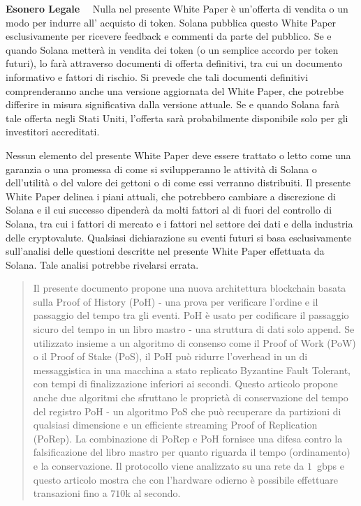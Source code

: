 \documentclass[12pt]{article}
\begin{document}
\maketitle

\textbf{\footnotesize Esonero Legale}\scriptsize
~~Nulla nel presente White Paper è un'offerta di vendita o un modo per indurre all' acquisto di token. Solana pubblica questo White Paper esclusivamente per ricevere feedback e commenti da parte del pubblico. Se e quando Solana metterà in vendita dei token (o un semplice accordo per token futuri), lo farà attraverso documenti di offerta definitivi, tra cui un documento informativo e fattori di rischio. Si prevede che tali documenti definitivi comprenderanno anche una versione aggiornata del White Paper, che potrebbe differire in misura significativa dalla versione attuale. Se e quando Solana farà tale offerta negli Stati Uniti, l'offerta sarà probabilmente disponibile solo per gli investitori accreditati.


Nessun elemento del presente White Paper deve essere trattato o letto come una garanzia o una promessa di come si svilupperanno le attività di Solana  o dell'utilità o del valore dei gettoni o di come essi verranno distribuiti. Il presente White Paper delinea i piani attuali, che potrebbero cambiare a discrezione di Solana e il cui successo dipenderà da molti fattori al di fuori del controllo di Solana, tra cui i fattori di mercato e i fattori nel settore dei dati e della industria delle cryptovalute. Qualsiasi dichiarazione su eventi futuri si basa esclusivamente sull'analisi delle questioni descritte nel presente White Paper effettuata da Solana. Tale analisi potrebbe rivelarsi errata.


\begin{abstract}\label{Astratto}
Il presente documento propone una nuova architettura blockchain basata sulla Proof of History (PoH) - una prova per verificare l'ordine e il passaggio del tempo tra gli eventi. PoH è usato per codificare il passaggio sicuro del tempo in un libro mastro - una struttura di dati solo append. Se utilizzato insieme a un algoritmo di consenso come il Proof of Work (PoW) o il Proof of Stake (PoS), il PoH può ridurre l'overhead in un di messaggistica in una macchina a stato replicato Byzantine Fault Tolerant, con tempi di finalizzazione inferiori ai secondi. Questo articolo propone anche due algoritmi che sfruttano le proprietà di conservazione del tempo del registro PoH - un algoritmo PoS che può recuperare da partizioni di qualsiasi dimensione e un efficiente streaming Proof of Replication (PoRep). La combinazione di PoRep e PoH fornisce una difesa contro la falsificazione del libro mastro per quanto riguarda il tempo (ordinamento) e la conservazione. Il protocollo viene analizzato su una rete da $1$~gbps e questo articolo mostra che con l'hardware odierno è possibile effettuare transazioni fino a $710$k al secondo.

\end{abstract}
\end{document}
